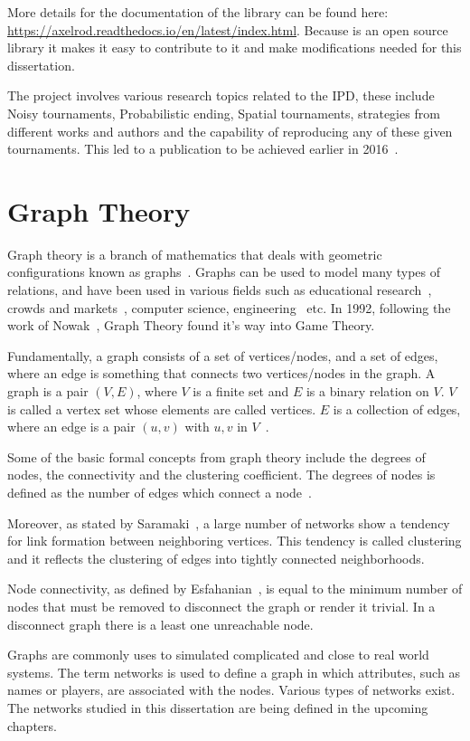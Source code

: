 More details for the documentation of the library can be found here:
\url{https://axelrod.readthedocs.io/en/latest/index.html}.
Because is an open source library it makes it easy to contribute to it and
make modifications needed for this dissertation.

The project involves various research topics related to the IPD, these include
Noisy tournaments, Probabilistic ending, Spatial tournaments, strategies from
different works and authors and the capability of reproducing any of these given
tournaments. This led to a publication to be achieved earlier in 2016~\cite{Knight2016}.

\section{Graph Theory}
\label{sub:graph-theory}
Graph theory is a branch of mathematics that deals with geometric configurations
known as graphs~\cite{10.2307/1170318}. Graphs can be used to
model many types of relations, and have been used in various fields such as
educational research~\cite{10.2307/1170318}, crowds and markets~\cite{Easley2010},
computer science, engineering~\cite{Singh2014} etc. In 1992, following the work
of Nowak~\cite{Nowak1992,Nowak1993}, Graph Theory found it's way into Game Theory.

Fundamentally, a graph consists of a set of vertices/nodes, and a set of edges, where
an edge is something that connects two vertices/nodes in the graph. A graph is a pair
$(V,E)$, where \(V\) is a finite set and \(E\) is a binary relation on \(V\). \(V\)
is called a vertex set whose elements are called vertices. \(E\) is a collection
of edges, where an edge is a pair $(u,v)$ with $u,v$ in \(V\)~\cite{Sadavare2012}.

Some of the basic formal concepts from graph theory include the degrees of
nodes, the connectivity and the clustering coefficient. The degrees of nodes is
defined as the number of edges which connect a node~\cite{Sadavare2012}.

Moreover, as stated by Saramaki~\cite{Saramaki2007}, a large number of networks
show a tendency for link formation between neighboring vertices. This tendency is
called clustering and it reflects the clustering of edges into tightly connected
neighborhoods.

Node connectivity, as defined by Esfahanian~\cite{Esfahanian}, is equal to the
minimum number of nodes that must be removed to disconnect the graph or render
it trivial. In a disconnect graph there is a least one unreachable node.

Graphs are commonly uses to simulated complicated and close to real world systems.
The term networks is used to define a graph in which attributes, such as names or
players, are associated with the nodes. Various types of networks exist. The
networks studied in this dissertation are being defined in the upcoming chapters.
